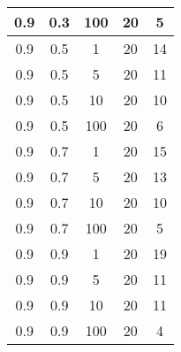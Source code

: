 \begin{appendices}
\begin{longtable}{|c|c|c|c|c|}
 0.9   & 0.3    & 100  & 20    & 5     \\ \hline
 0.9   & 0.5    & 1    & 20    & 14    \\ \hline
 0.9   & 0.5    & 5    & 20    & 11    \\ \hline
 0.9   & 0.5    & 10   & 20    & 10    \\ \hline
 0.9   & 0.5    & 100  & 20    & 6     \\ \hline
 0.9   & 0.7    & 1    & 20    & 15    \\ \hline
 0.9   & 0.7    & 5    & 20    & 13    \\ \hline
 0.9   & 0.7    & 10   & 20    & 10    \\ \hline
 0.9   & 0.7    & 100  & 20    & 5     \\ \hline
 0.9   & 0.9    & 1    & 20    & 19    \\ \hline
 0.9   & 0.9    & 5    & 20    & 11    \\ \hline
 0.9   & 0.9    & 10   & 20    & 11    \\ \hline
 0.9   & 0.9    & 100  & 20    & 4     \\ \hline
 	\end{longtable}
 	
 	
 	
 	
 	
 	
 	
 	
\end{appendices}
